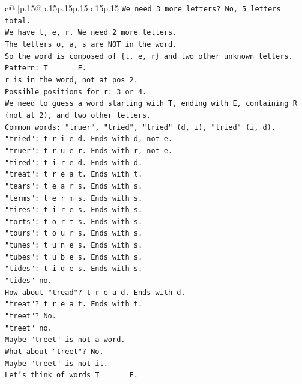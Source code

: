 \documentclass{article}
\begin{document}
{\begin{supertabular}{c@{$\;$}|p{.15\linewidth}@{}p{.15\linewidth}p{.15\linewidth}p{.15\linewidth}p{.15\linewidth}p{.15\linewidth}}
{{{\texttt{We need 3 more letters? No, 5 letters total.} \\
\texttt{We have t, e, r. We need 2 more letters.} \\
\texttt{The letters o, a, s are NOT in the word.} \\
\texttt{So the word is composed of \{t, e, r\} and two other unknown letters.} \\
\texttt{Pattern: T \_ \_ \_ E.} \\
\texttt{r is in the word, not at pos 2.} \\
\texttt{Possible positions for r: 3 or 4.} \\
\texttt{We need to guess a word starting with T, ending with E, containing R (not at 2), and two other letters.} \\
\texttt{Common words: "truer", "tried", "tried" (d, i), "tried" (i, d).} \\
\texttt{"tried": t r i e d. Ends with d, not e.} \\
\texttt{"truer": t r u e r. Ends with r, not e.} \\
\texttt{"tired": t i r e d. Ends with d.} \\
\texttt{"treat": t r e a t. Ends with t.} \\
\texttt{"tears": t e a r s. Ends with s.} \\
\texttt{"terms": t e r m s. Ends with s.} \\
\texttt{"tires": t i r e s. Ends with s.} \\
\texttt{"torts": t o r t s. Ends with s.} \\
\texttt{"tours": t o u r s. Ends with s.} \\
\texttt{"tunes": t u n e s. Ends with s.} \\
\texttt{"tubes": t u b e s. Ends with s.} \\
\texttt{"tides": t i d e s. Ends with s.} \\
\texttt{"tides" no.} \\
\texttt{How about "tread"? t r e a d. Ends with d.} \\
\texttt{"treat"? t r e a t. Ends with t.} \\
\texttt{"treet"? No.} \\
\texttt{"treet" no.} \\
\texttt{Maybe "treet" is not a word.} \\
\texttt{What about "treet"? No.} \\
\texttt{Maybe "treet" is not it.} \\
\texttt{Let's think of words T \_ \_ \_ E.} \\
}}}
\end{supertabular}}
\end{document}
